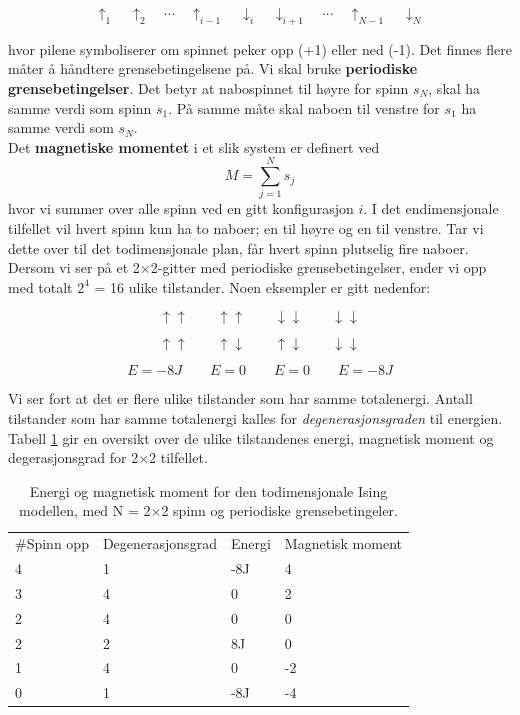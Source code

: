 \documentclass[11pt,a4paper]{article}
\begin{document}
\[\uparrow_1 \quad \uparrow_2 \quad  ... \quad \uparrow_{i-1}  \quad \downarrow_i  \quad \downarrow_{i+1} \quad ...\quad \uparrow_{N-1} \quad \downarrow_N \]

hvor pilene symboliserer om spinnet peker opp (+1) eller ned (-1). Det finnes flere måter å håndtere grensebetingelsene på. Vi skal bruke \textbf{periodiske grensebetingelser}. Det betyr at nabospinnet til høyre for spinn $s_N$, skal ha samme verdi som spinn $s_1$. På samme måte skal naboen til venstre for $s_1$ ha samme verdi som $s_N$. \\

Det \textbf{magnetiske momentet} i et slik system er definert ved 
\begin{equation}
M = \sum_{j=1} ^N s_j
\end{equation}
hvor vi summer over alle spinn ved en gitt konfigurasjon $i$. I det endimensjonale tilfellet vil hvert spinn kun ha to naboer; en til høyre og en til venstre. Tar vi dette over til det todimensjonale plan, får hvert spinn plutselig fire naboer. Dersom vi ser på et 2$\times$2-gitter med periodiske grensebetingelser, ender vi opp med totalt $2^4$ = 16 ulike tilstander. Noen eksempler er gitt nedenfor:

\[ \uparrow \uparrow \quad \quad \uparrow \uparrow \quad \quad \downarrow \downarrow \quad \quad \downarrow \downarrow \]

\[ \uparrow \uparrow \quad \quad \uparrow \downarrow \quad \quad \uparrow \downarrow \quad \quad \downarrow \downarrow \]

\[ E = -8J \quad \quad E = 0 \quad \quad E = 0 \quad \quad E = -8J \]

Vi ser fort at det er flere ulike tilstander som har samme totalenergi. Antall tilstander som har samme totalenergi kalles for \textit{degenerasjonsgraden} til energien. Tabell \ref{degen}  gir en oversikt over de ulike tilstandenes energi, magnetisk moment og degerasjonsgrad for 2$\times$2 tilfellet.

\FloatBarrier
\begin{table}[!ht]
\centering
\caption{Energi og magnetisk moment for den todimensjonale Ising modellen, med N = 2$\times$2 spinn og periodiske grensebetingeler.}
\label{degen}
\begin{tabular}{llll}
\#Spinn opp & Degenerasjonsgrad & Energi & Magnetisk moment \\
4           & 1                 & -8J    & 4             \\
3           & 4                 & 0      & 2             \\
2           & 4                 & 0      & 0             \\
2           & 2                 & 8J     & 0             \\
1           & 4                 & 0      & -2            \\
0           & 1                 & -8J    & -4           
\end{tabular}
\end{table}
\FloatBarrier
\end{document}
